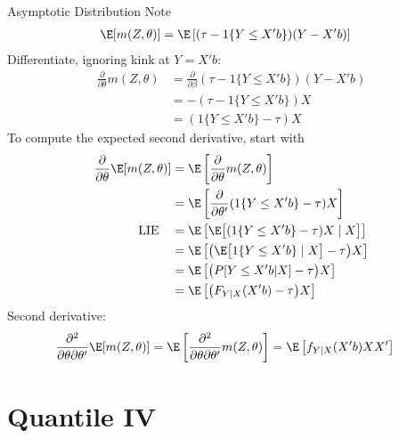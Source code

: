 \documentclass[handout]{beamer}
\begin{document}
\begin{frame}[shrink]{Asymptotic Distribution}
Note
\begin{align*}
  \E[m(Z,\theta)]
  &=
  \E\left[
    (\tau-{1}\{Y\leq X'b\})(Y-X'b)
  \right]
\end{align*}
Differentiate, ignoring kink at $Y=X'b$:
\begin{align*}
  \frac{\partial}{\partial \theta}
  m(Z,\theta)
  &=
  \frac{\partial}{\partial \beta}
  (\tau-{1}\{Y\leq X'b\})(Y-X'b)
  \\
  &=
  -
  (\tau-{1}\{Y\leq X'b\})X
  \\
  &=
  ({1}\{Y\leq X'b\}-\tau)X
\end{align*}
To compute the expected second derivative, start with
\begin{align*}
  \frac{\partial}{\partial\theta}
  \E[m(Z,\theta)]
  &=
  \E\left[
    \frac{\partial}{\partial\theta}
    m(Z,\theta)
  \right]
  \\
  &=
  \E\left[
  \frac{\partial}{\partial\theta'}
  ({1}\{Y\leq X'b\}-\tau)X
  \right]
  \\
  \text{LIE}\quad
  &=
  \E\left[
    \E\big[
    ({1}\{Y\leq X'b\}-\tau)X
    \;|\;X
    \big]
  \right]
  \\
  &=
  \E\left[
    \big(
      \E\big[
      {1}\{Y\leq X'b\}
      \;|\;X
      \big]
      -\tau
    \big)X
  \right]
  \\
  &=
  \E\left[
    \big(
      P[Y\leq X'b |X]
      -\tau
    \big)X
  \right]
  \\
  &=
  \E\left[
    \big(
      F_{Y|X}(X'b)
      -\tau
    \big)X
  \right]
\end{align*}
Second derivative:
\begin{align*}
  \frac{\partial^2}{\partial \theta\partial\theta'}
  \E[m(Z,\theta)]
  &=
  \E\left[
    \frac{\partial^2}{\partial \theta\partial\theta'}
    m(Z,\theta)
  \right]
  =
  \E\left[
    f_{Y|X}(X'b)
    XX'
  \right]
\end{align*}

\end{frame}


\section{Quantile IV}
\end{document}
